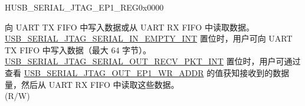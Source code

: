 \begin{register}{H}{USB\_SERIAL\_JTAG\_EP1\_REG}{0x0000}\label{regdesc:USBSERIALJTAGEP1REG}
%
%
\regnewline%
\begin{regdesc}\begin{reglist}
\label{fielddesc:USBSERIALJTAGRDWRBYTE}\item [USB\_SERIAL\_JTAG\_RDWR\_BYTE] 向 UART TX FIFO 中写入数据或从 UART RX FIFO 中读取数据。\\
\hyperref[int:USBSERIALJTAGSERIALINEMPTYINT]{USB\_SERIAL\_JTAG\_SERIAL\_IN\_EMPTY\_INT} 置位时，用户可向 UART TX FIFO 中写入数据（最大 64 字节）。\\
\hyperref[int:USBSERIALJTAGSERIALOUTRECVPKTINT]{USB\_SERIAL\_JTAG\_SERIAL\_OUT\_RECV\_PKT\_INT} 置位时，用户可通过查看 \hyperref[fielddesc:USBSERIALJTAGOUTEP1WRADDR]{USB\_SERIAL\_JTAG\_OUT\_EP1\_WR\_ADDR} 的值获知接收到的数据量，然后从 UART RX FIFO 中读取这些数据。\\
(R/W)
\end{reglist}\end{regdesc}
\end{register}


